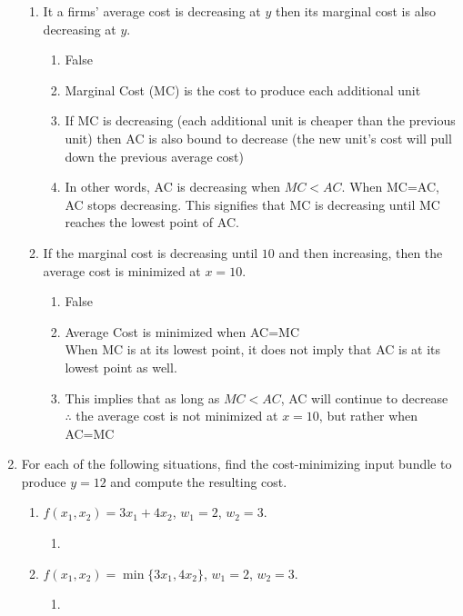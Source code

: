 \documentclass[11pt]{article}
\begin{document}
\begin{enumerate}
\begin{enumerate}
        \item It a firms' average cost is decreasing at $y$ then its marginal cost is also decreasing at $y$.
        \begin{enumerate}
            \item False
            \item Marginal Cost (MC) is the cost to produce each additional unit
            \item If MC is decreasing (each additional unit is cheaper than the previous unit) then AC is also bound to decrease (the new unit's cost will pull down the previous average cost)
            \item In other words, AC is decreasing when $MC<AC$. When MC=AC, AC stops decreasing. This signifies that MC is decreasing until MC reaches the lowest point of AC.
        \end{enumerate}

        \item If the marginal cost is decreasing until $10$ and then increasing, then the average cost is minimized at $x=10$.
        \begin{enumerate}
            \item False
            \item Average Cost is minimized when AC=MC\\
            When MC is at its lowest point, it does not imply that AC is at its lowest point as well.
            \item This implies that as long as $MC<AC$, AC will continue to decrease\\
            $\therefore$ the average cost is not minimized at $x=10$, but rather when AC=MC
            
        \end{enumerate}

    \end{enumerate}

\item For each of the following situations, find the cost-minimizing input bundle to produce $y=12$ and compute the resulting cost.
    \begin{enumerate}
        \item $f(x_{1},x_{2})=3x_{1}+4x_{2}$, $w_{1}=2$, $w_{2}=3$.
        \begin{enumerate}
            \item 
        \end{enumerate}

        \item $f(x_{1},x_{2})=\min\{3x_{1},4x_{2}\}$, $w_{1}=2$, $w_{2}=3$.
        \begin{enumerate}
            \item 
        \end{enumerate}


\end{enumerate}
\end{enumerate}
\end{document}
